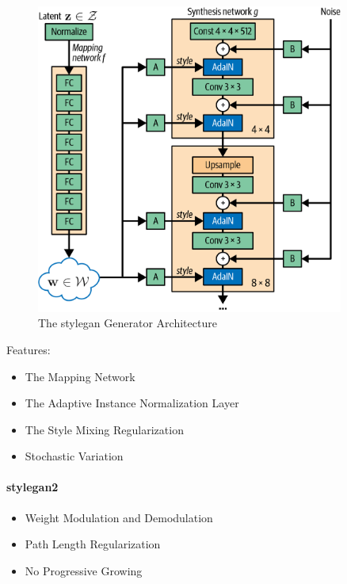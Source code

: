 \begin{figure}
	\begin{center}
		\includegraphics[width=0.9\textwidth]{figures/stylegan.png}
	\end{center}
	\caption{The \gls{stylegan} Generator Architecture}\label{fig:stylegan}
\end{figure}

Features:

\begin{itemize}
	\item The Mapping Network
	\item The Adaptive Instance Normalization Layer
	\item The Style Mixing Regularization
	\item Stochastic Variation
\end{itemize}

\paragraph{\gls{stylegan}2}

\begin{itemize}
	\item  Weight Modulation and Demodulation
	\item Path Length Regularization
	\item No Progressive Growing
\end{itemize}



